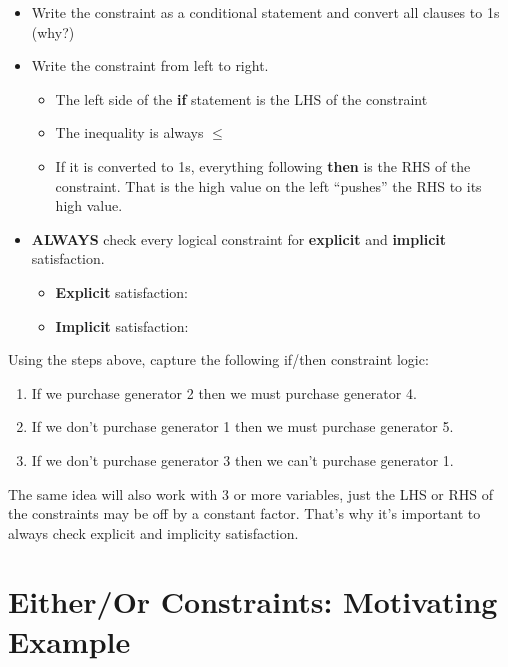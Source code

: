 \documentclass[11pt]{article}
\theoremstyle{definition}
\begin{document}
\begin{itemize}
\item Write the constraint as a conditional statement and convert all clauses to 1s (why?) \vspace{0.5in}
\item Write the constraint from left to right.
	\begin{itemize}
	\item The left side of the \textbf{if} statement is the LHS of the constraint
	\item The inequality is always $\leq$
	\item If it is converted to 1s, everything following \textbf{then} is the RHS of the constraint. That is the high value on the left ``pushes'' the RHS to its high value.
	\end{itemize}
\item \textbf{ALWAYS} check every logical constraint for \textbf{explicit} and \textbf{implicit} satisfaction.
	\begin{itemize}
	\item \textbf{Explicit} satisfaction: \vspace{1in}
	\item \textbf{Implicit} satisfaction: \newpage
	\end{itemize}
\end{itemize}

Using the steps above, capture the following if/then constraint logic:
\begin{enumerate}[resume]
\item If we purchase generator 2 then we must purchase generator 4. \vspace{2in}
\item If we don't purchase generator 1 then we must purchase generator 5. \vspace{2in}
\item If we don't purchase generator 3 then we can't purchase generator 1. \vfill
\end{enumerate}

\begin{tcolorbox}
The same idea will also work with 3 or more variables, just the LHS or RHS of the constraints may be off by a constant factor. That's why it's important to always check explicit and implicity satisfaction.
\end{tcolorbox}



\newpage

\section{Either/Or Constraints: Motivating Example}
\end{document}

